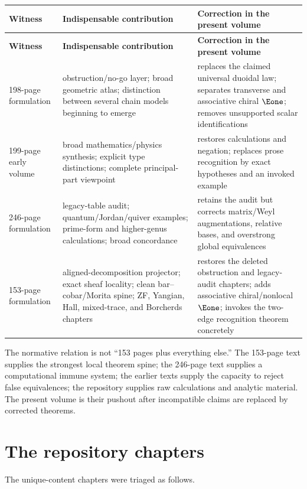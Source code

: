 \begin{longtable}{p{}p{}p{}}
\toprule
\textbf{Witness} & \textbf{Indispensable contribution} & \textbf{Correction in the present volume}\\
\midrule
\endfirsthead
\toprule
\textbf{Witness} & \textbf{Indispensable contribution} & \textbf{Correction in the present volume}\\
\midrule
\endhead
198-page formulation & obstruction/no-go layer; broad geometric atlas; distinction between several chain models beginning to emerge & replaces the claimed universal duoidal law; separates transverse and associative chiral \(\Eone\); removes unsupported scalar identifications\\
199-page early volume & broad mathematics/physics synthesis; explicit type distinctions; complete principal-part viewpoint & restores calculations and negation; replaces prose recognition by exact hypotheses and an invoked example\\
246-page formulation & legacy-table audit; quantum/Jordan/quiver examples; prime-form and higher-genus calculations; broad concordance & retains the audit but corrects matrix/Weyl augmentations, relative bases, and overstrong global equivalences\\
153-page formulation & aligned-decomposition projector; exact sheaf locality; clean bar--cobar/Morita spine; ZF, Yangian, Hall, mixed-trace, and Borcherds chapters & restores the deleted obstruction and legacy-audit chapters; adds associative chiral/nonlocal \(\Eone\); invokes the two-edge recognition theorem concretely\\
\bottomrule
\end{longtable}

\begin{sourcebox}
The normative relation is not ``153 pages plus everything else.''  The 153-page text supplies the strongest local theorem spine; the 246-page text supplies a computational immune system; the earlier texts supply the capacity to reject false equivalences; the repository supplies raw calculations and analytic material.  The present volume is their pushout after incompatible claims are replaced by corrected theorems.
\end{sourcebox}

\section{The repository chapters}
The unique-content chapters were triaged as follows.

